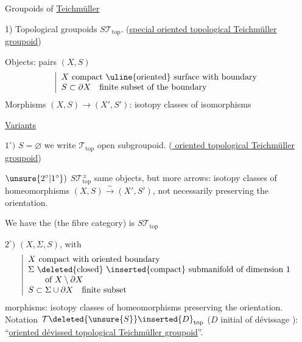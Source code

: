Groupoids of \uline{Teichmüller}

1) Topological groupoids $\boxed{S\mathcal T_{\mathrm{top}}}$.
(\uline{special oriented topological Teichmüller groupoid})

Objects: pairs $(X,S)$
\[
\left|\begin{array}{l}
X\ \text{compact \uline{oriented} surface with boundary}\\
S\subset\partial X\quad\text{finite subset of the boundary}
\end{array}\right.
\]
Morphisms $(X,S)\longrightarrow(X',S')$: isotopy classes of isomorphisms

 \uline{Variants}

$1^\circ)$ $S=\varnothing$ we write $\mathcal T_{\mathrm{top}}$ open subgroupoid.
(\uline{ oriented topological Teichmüller groupoid})

$\unsure{2^\circ|1^\circ})$ $\boxed{S\mathcal T_{\mathrm{top}}^\pm}$ same objects, but more arrows:
isotopy classes of homeomorphisms $(X,S)\xrightarrow{\sim}(X',S')$, not necessarily preserving the orientation.

We have
the   (the fibre category) is $S\mathcal T_{\mathrm{top}}$

$2^\circ)$ $(X,\Sigma,S)$, with
\[
\left|\begin{array}{l}
X\ \text{compact with oriented boundary}\\
\Sigma\ \text{\deleted{closed} \inserted{compact} submanifold of dimension $1$}\\
\qquad\text{of }X\setminus\partial X\\
S\subset\Sigma\cup\partial X\quad\text{finite subset}
\end{array}\right.
\]
morphisms: isotopy classes of homeomorphisms preserving the orientation.
Notation $\mathcal T\deleted{\unsure{S}}\inserted{D}_{\mathrm{top}}$
($D$ initial of dévissage ):
``\uline{oriented dévissed topological Teichmüller groupoid}''.

